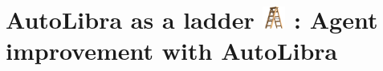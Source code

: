 \section{AutoLibra as a ladder \protect
\includegraphics[height=1em]{figs/ladder.png}
: Agent improvement with AutoLibra}
\label{sec:ladder}




